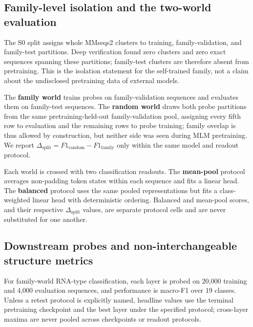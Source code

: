 \hypertarget{family-level-isolation-and-the-two-world-evaluation}{%
\subsection{Family-level isolation and the two-world evaluation}\label{family-level-isolation-and-the-two-world-evaluation}}

The S0 split assigns whole MMseqs2 clusters to training, family-validation, and family-test partitions. Deep verification found zero clusters and zero exact sequences spanning these partitions; family-test clusters are therefore absent from pretraining. This is the isolation statement for the self-trained family, not a claim about the undisclosed pretraining data of external models.

The \textbf{family world} trains probes on family-validation sequences and evaluates them on family-test sequences. The \textbf{random world} draws both probe partitions from the same pretraining-held-out family-validation pool, assigning every fifth row to evaluation and the remaining rows to probe training; family overlap is thus allowed by construction, but neither side was seen during MLM pretraining. We report \(\Delta_{\mathrm{split}}=F1_{\mathrm{random}}-F1_{\mathrm{family}}\) only within the same model and readout protocol.

Each world is crossed with two classification readouts. The \textbf{mean-pool} protocol averages non-padding token states within each sequence and fits a linear head. The \textbf{balanced} protocol uses the same pooled representations but fits a class-weighted linear head with deterministic ordering. Balanced and mean-pool scores, and their respective \(\Delta_{\mathrm{split}}\) values, are separate protocol cells and are never substituted for one another.

\hypertarget{downstream-probes-and-non-interchangeable-structure-metrics}{%
\subsection{Downstream probes and non-interchangeable structure metrics}\label{downstream-probes-and-non-interchangeable-structure-metrics}}

For family-world RNA-type classification, each layer is probed on 20,000 training and 4,000 evaluation sequences, and performance is macro-F1 over 19 classes. Unless a retest protocol is explicitly named, headline values use the terminal pretraining checkpoint and the best layer under the specified protocol; cross-layer maxima are never pooled across checkpoints or readout protocols.

